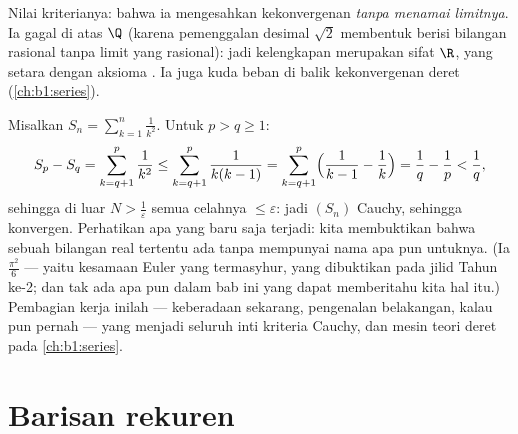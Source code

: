 \begin{remark}
Nilai kriterianya: bahwa ia mengesahkan kekonvergenan \emph{tanpa
menamai limitnya}. Ia gagal di atas $\Q$ (karena pemenggalan desimal
$\sqrt 2$ membentuk  berisi bilangan rasional tanpa limit yang
rasional): jadi kelengkapan merupakan sifat $\R$, yang setara dengan aksioma
. Ia juga kuda beban di balik kekonvergenan
deret (\cref{ch:b1:series}).
\end{remark}

\begin{example}\label{ex:b1:seq:basel}
Misalkan $S_n = \sum_{k=1}^{n} \frac{1}{k^2}$. Untuk $p > q \geq 1$:
\[
S_p - S_q = \sum_{k=q+1}^{p} \frac{1}{k^2}
\leq \sum_{k=q+1}^{p} \frac{1}{k(k-1)}
= \sum_{k=q+1}^{p} \Bigl(\frac{1}{k-1} - \frac 1k\Bigr)
= \frac 1q - \frac 1p < \frac 1q ,
\]
sehingga di luar $N > \frac1\varepsilon$ semua celahnya $\leq \varepsilon$:
jadi $(S_n)$ Cauchy, sehingga konvergen. Perhatikan apa yang baru saja terjadi: kita
membuktikan bahwa sebuah bilangan real tertentu ada tanpa mempunyai nama apa pun
untuknya. (Ia $\frac{\pi^2}{6}$ --- yaitu kesamaan Euler yang termasyhur,
yang dibuktikan pada jilid Tahun ke-2; dan tak ada apa pun dalam bab ini yang dapat
memberitahu kita hal itu.) Pembagian kerja inilah --- keberadaan sekarang,
pengenalan belakangan, kalau pun pernah --- yang menjadi seluruh inti kriteria
Cauchy, dan mesin teori deret pada
\cref{ch:b1:series}.
\end{example}

\section{Barisan rekuren}


